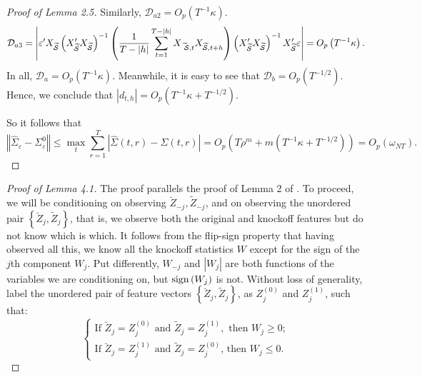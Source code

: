 ﻿\documentclass[12pt]{article}
\newcommand{\0}{\mbox{\bf 0}}
\theoremstyle{plain}%
\theoremstyle{definition}
\def\func#1{\mathop{\rm #1}}%
\begin{document}
{\begin{proof}[ Proof of Lemma 2.5]
Similarly, $\mathcal{D}_{a2}=O_{p}\left( T^{-1}\kappa \right) .$ 
\begin{equation*}
\mathcal{D}_{a3}=\left\vert \varepsilon ^{\prime }X_{\widetilde{\mathcal{S}}
}\left( X_{\widetilde{\mathcal{S}}}^{\prime }X_{\widetilde{\mathcal{S}}
}\right) ^{-1}\left( \frac{1}{T-|h|}\sum_{t=1}^{T-|h|}X_{\widetilde{\mathcal{%
\ S}},t}X_{\widetilde{\mathcal{S}},t+h}\right) \left( X_{\widetilde{\mathcal{%
S} }}^{\prime }X_{\widetilde{\mathcal{S}}}\right) ^{-1}X_{\widetilde{%
\mathcal{S} }}^{\prime }\varepsilon \right\vert =O_{p}\left( T^{-1}\kappa
\right) .
\end{equation*}
In all, $\mathcal{D}_{a}=O_{p}\left( T^{-1}\kappa \right) .$ Meanwhile, it
is easy to see that $\mathcal{D}_{b}=O_{p}\left( T^{-1/2}\right) .$ Hence,
we conclude that $|d_{t,h}|=O_{p}\left( T^{-1}\kappa +T^{-1/2}\right) .$

So it follows that 
\begin{equation*}
\left\Vert \widehat{\Sigma }_{\varepsilon }-\Sigma _{\varepsilon
}^{0}\right\Vert \leq \max_{t}\sum_{r=1}^{T}\left\vert \widehat{\Sigma }
(t,r)-\Sigma (t,r)\right\vert =O_{p}\left( T\rho ^{m}+m\left( T^{-1}\kappa
+T^{-1/2}\right) \right) =O_{p}\left( \omega _{NT}\right) .
\end{equation*}
\end{proof}

\bigskip

\begin{proof}[Proof of Lemma 4.1]
The proof parallels the proof of Lemma 2 of \citet*[BCS]{BarberCandesSamworth2020}. To proceed, we will
be conditioning on observing $\breve{Z}_{-j},\widetilde{Z}_{-j}$, and on
observing the unordered pair $\left\{ \breve{Z}_{j},\widetilde{Z}
_{j}\right\} $, that is, we observe both the original and knockoff features
but do not know which is which. It follows from the flip-sign property that
having observed all this, we know all the knockoff statistics $W$ except for
the sign of the $j$th component $W_{j}$. Put differently, $W_{-j}$ and $%
\left\vert W_{j}\right\vert $ are both functions of the variables we are
conditioning on, but $\func{sign}\left(W_{j}\right) $ is not. Without loss
of generality, label the unordered pair of feature vectors $\left\{ \breve{Z}
_{j},\widetilde{Z}_{j}\right\} $, as $Z_{j}^{(0)}$ and $Z_{j}^{(1)}$, such
that: 
\begin{equation}  \label{eq:Z0Z1}
\left\{ 
\begin{array}{l}
\text{If }\breve{Z}_{j}=Z_{j}^{(0)}\text{ and }\widetilde{Z}
_{j}=Z_{j}^{(1)},\text{ then }W_{j}\geq 0; \\ 
\text{If }\breve{Z}_{j}=Z_{j}^{(1)}\text{ and }\widetilde{Z}_{j}=Z_{j}^{(0)} 
\text{, then }W_{j}\leq 0.%
\end{array}
\right.
\end{equation}


\end{proof}}
\end{document}
